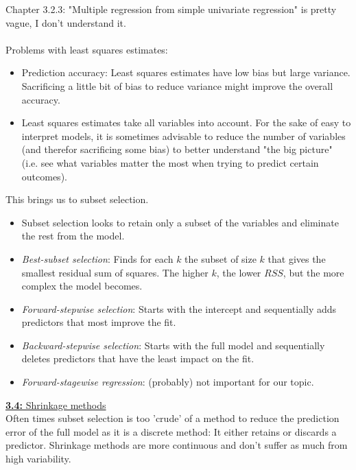 Chapter 3.2.3: "Multiple regression from simple univariate regression" is pretty vague, I don't understand it. \\
\\
Problems with least squares estimates:
\begin{itemize}
    \item Prediction accuracy: Least squares estimates have low bias but large variance. Sacrificing a little bit of bias to reduce variance might improve the overall accuracy.
    \item Least squares estimates take all variables into account. For the sake of easy to interpret models, it is sometimes advisable to reduce the number of variables (and therefor sacrificing some bias) to better understand "the big picture" (i.e. see what variables matter the most when trying to predict certain outcomes).
\end{itemize}
This brings us to subset selection.
\begin{itemize}
    \item Subset selection looks to retain only a subset of the variables and eliminate the rest from the model.
    \item \textit{Best-subset selection}: Finds for each $k$ the subset of size $k$ that gives the smallest residual sum of squares. The higher $k$, the lower $RSS$, but the more complex the model becomes.
    \item \textit{Forward-stepwise selection}: Starts with the intercept and sequentially adds predictors that most improve the fit.
    \item \textit{Backward-stepwise selection}: Starts with the full model and sequentially deletes predictors that have the least impact on the fit.
    \item \textit{Forward-stagewise regression}: (probably) not important for our topic.
\end{itemize}
\underline{\textbf{3.4:} Shrinkage methods}\\
Often times subset selection is too 'crude' of a method to reduce the prediction error of the full model as it is a discrete method: It either retains or discards a predictor. Shrinkage methods are more continuous and don't suffer as much from high variability. 

